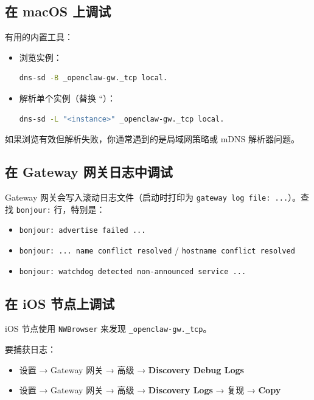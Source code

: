 \subsection{在 macOS 上调试}


有用的内置工具：

\begin{itemize}
  \item 浏览实例：
\begin{lstlisting}[language=bash]
  dns-sd -B _openclaw-gw._tcp local.
\end{lstlisting}

  \item 解析单个实例（替换 ``）：
\begin{lstlisting}[language=bash]
  dns-sd -L "<instance>" _openclaw-gw._tcp local.
\end{lstlisting}

\end{itemize}


如果浏览有效但解析失败，你通常遇到的是局域网策略或
mDNS 解析器问题。

\subsection{在 Gateway 网关日志中调试}


Gateway 网关会写入滚动日志文件（启动时打印为
\texttt{gateway log file: ...}）。查找 \texttt{bonjour:} 行，特别是：

\begin{itemize}
  \item \texttt{bonjour: advertise failed ...}
  \item \texttt{bonjour: ... name conflict resolved} / \texttt{hostname conflict resolved}
  \item \texttt{bonjour: watchdog detected non-announced service ...}
\end{itemize}


\subsection{在 iOS 节点上调试}


iOS 节点使用 \texttt{NWBrowser} 来发现 \texttt{\_openclaw-gw.\_tcp}。

要捕获日志：

\begin{itemize}
  \item 设置 → Gateway 网关 → 高级 → \textbf{Discovery Debug Logs}
  \item 设置 → Gateway 网关 → 高级 → \textbf{Discovery Logs} → 复现 → \textbf{Copy}
\end{itemize}


